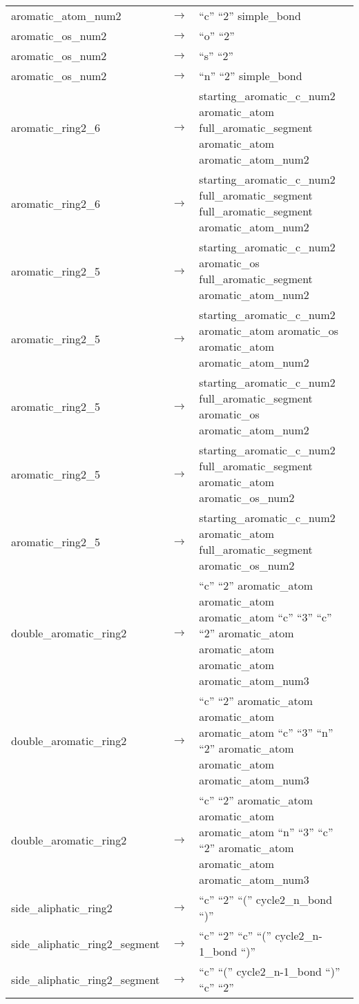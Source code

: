 \documentclass[../Document.tex]{subfiles}
\begin{document}
\begin{longtable}{m{} p{} p{}}
    aromatic\_atom\_num2 & $\rightarrow$ & ``c'' ``2'' simple\_bond \\
    aromatic\_os\_num2 & $\rightarrow$ & ``o'' ``2'' \\
    aromatic\_os\_num2 & $\rightarrow$ & ``s'' ``2'' \\
    aromatic\_os\_num2 & $\rightarrow$ & ``n'' ``2'' simple\_bond \\
    aromatic\_ring2\_6 & $\rightarrow$ & starting\_aromatic\_c\_num2 aromatic\_atom full\_aromatic\_segment aromatic\_atom aromatic\_atom\_num2 \\
    aromatic\_ring2\_6 & $\rightarrow$ & starting\_aromatic\_c\_num2 full\_aromatic\_segment full\_aromatic\_segment aromatic\_atom\_num2 \\
    aromatic\_ring2\_5 & $\rightarrow$ & starting\_aromatic\_c\_num2 aromatic\_os full\_aromatic\_segment aromatic\_atom\_num2 \\
    aromatic\_ring2\_5 & $\rightarrow$ & starting\_aromatic\_c\_num2 aromatic\_atom aromatic\_os aromatic\_atom aromatic\_atom\_num2 \\
    aromatic\_ring2\_5 & $\rightarrow$ & starting\_aromatic\_c\_num2 full\_aromatic\_segment aromatic\_os aromatic\_atom\_num2 \\
    aromatic\_ring2\_5 & $\rightarrow$ & starting\_aromatic\_c\_num2 full\_aromatic\_segment aromatic\_atom aromatic\_os\_num2 \\
    aromatic\_ring2\_5 & $\rightarrow$ & starting\_aromatic\_c\_num2 aromatic\_atom full\_aromatic\_segment aromatic\_os\_num2 \\
    double\_aromatic\_ring2 & $\rightarrow$ & ``c'' ``2'' aromatic\_atom aromatic\_atom aromatic\_atom ``c'' ``3'' ``c'' ``2'' aromatic\_atom aromatic\_atom aromatic\_atom aromatic\_atom\_num3 \\
    double\_aromatic\_ring2 & $\rightarrow$ & ``c'' ``2'' aromatic\_atom aromatic\_atom aromatic\_atom ``c'' ``3'' ``n'' ``2'' aromatic\_atom aromatic\_atom aromatic\_atom\_num3 \\
    double\_aromatic\_ring2 & $\rightarrow$ & ``c'' ``2'' aromatic\_atom aromatic\_atom aromatic\_atom ``n'' ``3'' ``c'' ``2'' aromatic\_atom aromatic\_atom aromatic\_atom\_num3 \\
    side\_aliphatic\_ring2 & $\rightarrow$ & ``c'' ``2'' ``('' cycle2\_n\_bond ``)'' \\
    side\_aliphatic\_ring2\_segment & $\rightarrow$ & ``c'' ``2'' ``c'' ``('' cycle2\_n-1\_bond ``)'' \\
    side\_aliphatic\_ring2\_segment & $\rightarrow$ & ``c'' ``('' cycle2\_n-1\_bond ``)'' ``c'' ``2'' \\

\end{longtable}
\end{document}
